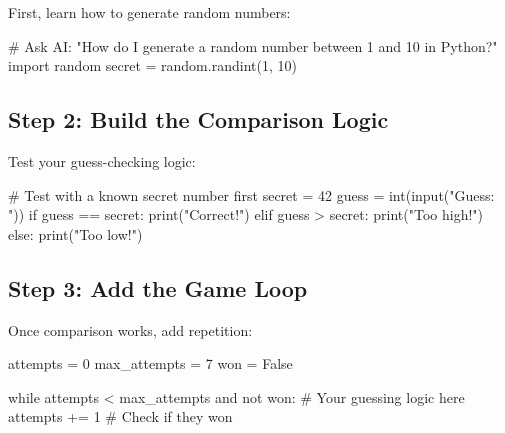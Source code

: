 \documentclass[
  letterpaper,
  DIV=11,
  numbers=noendperiod,
  oneside]{scrreprt}
\newenvironment{Shaded}{}{}
\newcommand{\BuiltInTok}[1]{\textcolor[rgb]{0.84,0.23,0.29}{#1}}
\newcommand{\CommentTok}[1]{\textcolor[rgb]{0.42,0.45,0.49}{#1}}
\newcommand{\ControlFlowTok}[1]{\textcolor[rgb]{0.84,0.23,0.29}{#1}}
\newcommand{\DecValTok}[1]{\textcolor[rgb]{0.00,0.36,0.77}{#1}}
\newcommand{\ImportTok}[1]{\textcolor[rgb]{0.01,0.18,0.38}{#1}}
\newcommand{\KeywordTok}[1]{\textcolor[rgb]{0.84,0.23,0.29}{#1}}
\newcommand{\NormalTok}[1]{\textcolor[rgb]{0.14,0.16,0.18}{#1}}
\newcommand{\OperatorTok}[1]{\textcolor[rgb]{0.14,0.16,0.18}{#1}}
\newcommand{\StringTok}[1]{\textcolor[rgb]{0.01,0.18,0.38}{#1}}
\newcommand{\VariableTok}[1]{\textcolor[rgb]{0.89,0.38,0.04}{#1}}
\begin{document}
First, learn how to generate random numbers:

\begin{Shaded}
\begin{Highlighting}[]
\CommentTok{\# Ask AI: "How do I generate a random number between 1 and 10 in Python?"}
\ImportTok{import}\NormalTok{ random}
\NormalTok{secret }\OperatorTok{=}\NormalTok{ random.randint(}\DecValTok{1}\NormalTok{, }\DecValTok{10}\NormalTok{)}
\end{Highlighting}
\end{Shaded}

\subsection{Step 2: Build the Comparison
Logic}\label{step-2-build-the-comparison-logic}

Test your guess-checking logic:

\begin{Shaded}
\begin{Highlighting}[]
\CommentTok{\# Test with a known secret number first}
\NormalTok{secret }\OperatorTok{=} \DecValTok{42}
\NormalTok{guess }\OperatorTok{=} \BuiltInTok{int}\NormalTok{(}\BuiltInTok{input}\NormalTok{(}\StringTok{"Guess: "}\NormalTok{))}
\ControlFlowTok{if}\NormalTok{ guess }\OperatorTok{==}\NormalTok{ secret:}
    \BuiltInTok{print}\NormalTok{(}\StringTok{"Correct!"}\NormalTok{)}
\ControlFlowTok{elif}\NormalTok{ guess }\OperatorTok{\textgreater{}}\NormalTok{ secret:}
    \BuiltInTok{print}\NormalTok{(}\StringTok{"Too high!"}\NormalTok{)}
\ControlFlowTok{else}\NormalTok{:}
    \BuiltInTok{print}\NormalTok{(}\StringTok{"Too low!"}\NormalTok{)}
\end{Highlighting}
\end{Shaded}

\subsection{Step 3: Add the Game Loop}\label{step-3-add-the-game-loop}

Once comparison works, add repetition:

\begin{Shaded}
\begin{Highlighting}[]
\NormalTok{attempts }\OperatorTok{=} \DecValTok{0}
\NormalTok{max\_attempts }\OperatorTok{=} \DecValTok{7}
\NormalTok{won }\OperatorTok{=} \VariableTok{False}

\ControlFlowTok{while}\NormalTok{ attempts }\OperatorTok{\textless{}}\NormalTok{ max\_attempts }\KeywordTok{and} \KeywordTok{not}\NormalTok{ won:}
    \CommentTok{\# Your guessing logic here}
\NormalTok{    attempts }\OperatorTok{+=} \DecValTok{1}
    \CommentTok{\# Check if they won}
\end{Highlighting}
\end{Shaded}
\end{document}
